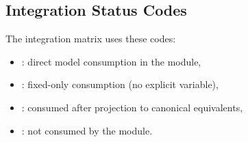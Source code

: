 \subsection{Integration Status Codes}

The integration matrix uses these codes:
\begin{itemize}
  \item {}: direct model consumption in the module,
  \item {}: fixed-only consumption (no explicit variable),
  \item {}: consumed after projection to canonical equivalents,
  \item {}: not consumed by the module.
\end{itemize}
